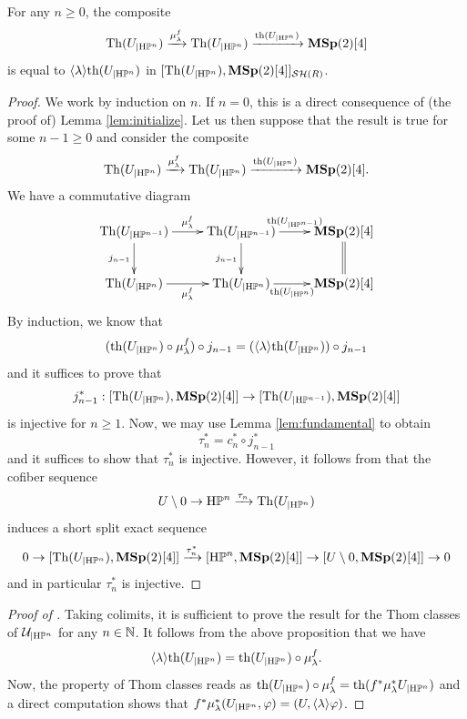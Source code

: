 \begin{num}
\begin{prop}
For any $n\geq 0$, the composite
\[
\mathrm{Th}(U_{\vert \mathrm{H}\mathbb P^n})\xrightarrow{\mu_{\lambda}^f} \mathrm{Th}(U_{\vert \mathrm{H}\mathbb P^n})\xrightarrow{\mathrm{th}(U_{\vert \mathrm{H}\mathbb P^n})} \mathbf{MSp}(2)[4]
\]
is equal to $\langle \lambda\rangle \mathrm{th}(U_{\vert \mathrm{H}\mathbb P^n})$ in $[\mathrm{Th}(U_{\vert \mathrm{H}\mathbb P^n}),\mathbf{MSp}(2)[4]]_{\mathcal{SH}(R)}$.
\end{prop}

\begin{proof}
We work by induction on $n$. If $n=0$, this is a direct consequence of (the proof of) Lemma \ref{lem:initialize}. Let us then suppose that the result is true for some $n-1\geq 0$ and consider the composite
 \[
\mathrm{Th}(U_{\vert \mathrm{H}\mathbb P^n})\xrightarrow{\mu_{\lambda}^f} \mathrm{Th}(U_{\vert \mathrm{H}\mathbb P^n})\xrightarrow{\mathrm{th}(U_{\vert \mathrm{H}\mathbb P^n})} \mathbf{MSp}(2)[4].
\]
We have a commutative diagram
\[
\xymatrix{\mathrm{Th}(U_{\vert \HP^{n-1}})\ar[r]^-{\mu_{\lambda}^f}\ar[d]_-{j_{n-1}} & \mathrm{Th}(U_{\vert \HP^{n-1}})\ar[r]^-{\mathrm{th}(U_{\vert \HP^{n-1}})}\ar[d]_-{j_{n-1}} & \mathbf{MSp}(2)[4]\ar@{=}[d]
\\ \mathrm{Th}(U_{\vert \HP^n})\ar[r]_-{\mu_{\lambda}^f} & \mathrm{Th}(U_{\vert \HP^n})\ar[r]_-{\mathrm{th}(U_{\vert \HP^n})} & \mathbf{MSp}(2)[4]}
\]
By induction, we know that  
\[
(\mathrm{th}(U_{\vert \mathrm{H}\mathbb P^n})\circ \mu_{\lambda}^f)\circ j_{n-1}=(\langle \lambda\rangle \mathrm{th}(U_{\vert \mathrm{H}\mathbb P^n}))\circ j_{n-1}
\]
and it suffices to prove that 
\[
j_{n-1}^*:[\mathrm{Th}(U_{\vert \mathrm{H}\mathbb P^n}),\mathbf{MSp}(2)[4]]\to [\mathrm{Th}(U_{\vert \mathrm{H}\mathbb P^{n-1}}),\mathbf{MSp}(2)[4]]
\]
is injective for $n\geq 1$. Now, we may use Lemma \ref{lem:fundamental} to obtain
\[
\tau_n^*=c_n^*\circ j_{n-1}^*
\]
and it suffices to show that $\tau_n^*$ is injective. However, it follows from \cite{PWQuaternionic} that the cofiber sequence
\[
U\setminus 0\to \mathrm{H}\mathbb P^n \xrightarrow{\tau_n} \mathrm{Th}(U_{\vert  \mathrm{H}\mathbb P^n})
\]
induces a short split exact sequence
\[
0\to [\mathrm{Th}(U_{\vert  \mathrm{H}\mathbb P^n}),\mathbf{MSp}(2)[4]]\xrightarrow{\tau_n^*}[\mathrm{H}\mathbb P^n,\mathbf{MSp}(2)[4]]\to  [U\setminus 0,\mathbf{MSp}(2)[4]]\to 0
\]
and in particular $\tau_n^*$ is injective.
\end{proof}

\begin{proof}[Proof of ]
Taking colimits, it is sufficient to prove the result for the Thom classes of $\mathcal U_{\vert \mathrm{H}\mathbb P^n}$ for any $n\in \mathbb{N}$. It follows from the above proposition that we have
\[
\langle \lambda\rangle \mathrm{th}(U_{\vert \mathrm{H}\mathbb P^n})=\mathrm{th}(U_{\vert \mathrm{H}\mathbb P^n})\circ \mu_{\lambda}^f.
\]
Now, the property of Thom classes reads as $\mathrm{th}(U_{\vert \mathrm{H}\mathbb P^n})\circ \mu_{\lambda}^f=\mathrm{th}(f^*\mu_{\lambda}^*U_{\vert \mathrm{H}\mathbb P^n})$ and a direct computation shows that $f^*\mu_{\lambda}^*(U_{\vert \mathrm{H}\mathbb P^n},\varphi)=(U,\langle\lambda\rangle \varphi)$.
\end{proof}
 

\end{num}
